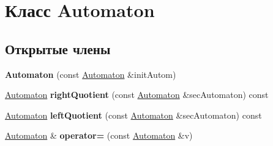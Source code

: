 \hypertarget{class_automaton}{}\section{Класс Automaton}
\label{class_automaton}
\subsection*{Открытые члены}
\begin{DoxyCompactItemize}
\item 
\mbox{\label{class_automaton_a928fe129c26a826a703e4683587568f6}} 
{\bfseries Automaton} (const \mbox{\hyperlink{class_automaton}{Automaton}} \&init\+Autom)
\item 
\mbox{\label{class_automaton_a3e997b515536e08f97e3fef599e51d8f}} 
\mbox{\hyperlink{class_automaton}{Automaton}} {\bfseries right\+Quotient} (const \mbox{\hyperlink{class_automaton}{Automaton}} \&sec\+Automaton) const
\item 
\mbox{\label{class_automaton_ab6ffe327d6e520f3d3c8bdf5170e53d6}} 
\mbox{\hyperlink{class_automaton}{Automaton}} {\bfseries left\+Quotient} (const \mbox{\hyperlink{class_automaton}{Automaton}} \&sec\+Automaton) const
\item 
\mbox{\label{class_automaton_a9a1c46a6e72dcb748017e397aaf005e3}} 
\mbox{\hyperlink{class_automaton}{Automaton}} \& {\bfseries operator=} (const \mbox{\hyperlink{class_automaton}{Automaton}} \&v)
\end{DoxyCompactItemize}
